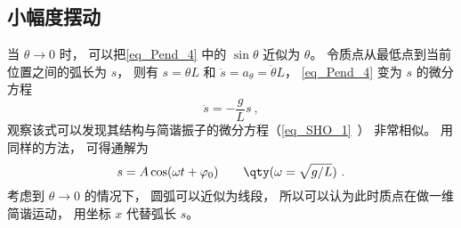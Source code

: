 \subsection{小幅度摆动}
当 $\theta \to 0$ 时， 可以把\autoref{eq_Pend_4} 中的 $\sin\theta$ 近似为 $\theta$。 令质点从最低点到当前位置之间的弧长为 $s$， 则有 $s = \theta L$ 和 $\ddot s = a_\theta = \ddot\theta L$， \autoref{eq_Pend_4} 变为 $s$ 的微分方程
\begin{equation}
\ddot s = - \frac gL s~,
\end{equation}
观察该式可以发现其结构与简谐振子的微分方程（\autoref{eq_SHO_1}~） 非常相似。 用同样的方法， 可得通解为
\begin{equation}
s = A\cos(\omega t + \varphi_0)  \qquad \qty(\omega  = \sqrt{g/L})~.
\end{equation}
考虑到 $\theta \to 0$ 的情况下， 圆弧可以近似为线段， 所以可以认为此时质点在做一维简谐运动， 用坐标 $x$ 代替弧长 $s$。
